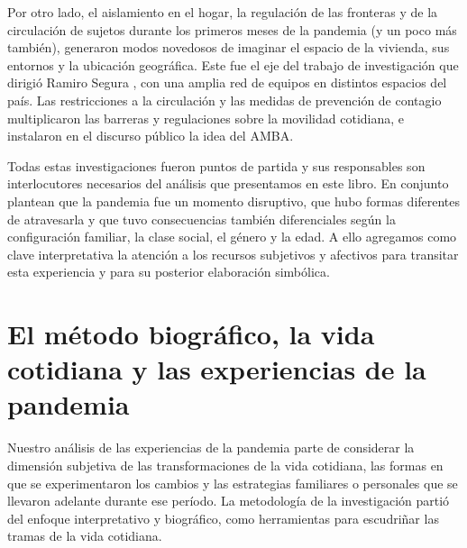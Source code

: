 \begin{refsection}
Por otro lado, el aislamiento en el hogar, la regulación de las fronteras y de la circulación de sujetos durante los primeros meses de la pandemia (y un poco más también), generaron modos novedosos de imaginar el espacio de la vivienda, sus entornos y la ubicación geográfica. Este fue el eje del trabajo de investigación que dirigió Ramiro Segura \protect\parencite*{4188-SEGURA2024}, con una amplia red de equipos en distintos espacios del país. Las restricciones a la circulación y las medidas de prevención de contagio multiplicaron las barreras y regulaciones sobre la movilidad cotidiana, e instalaron en el discurso público la idea del AMBA.

Todas estas investigaciones fueron puntos de partida y sus responsables son interlocutores necesarios del análisis que presentamos en este libro. En conjunto plantean que la pandemia fue un momento disruptivo, que hubo formas diferentes de atravesarla y que tuvo consecuencias también diferenciales según la configuración familiar, la clase social, el género y la edad. A ello agregamos como clave interpretativa la atención a los recursos subjetivos y afectivos para transitar esta experiencia y para su posterior elaboración simbólica.


\section[El método biográfico, la vida cotidiana y las experiencias de la pandemia]{El método biográfico, la vida cotidiana y las experiencias de la pandemia}
\label{cap-21.el-metodo-biografico-la-vida-cotidiana-y-las-experiencias-de-la-pandemia}
Nuestro análisis de las experiencias de la pandemia parte de considerar la dimensión subjetiva de las transformaciones de la vida cotidiana, las formas en que se experimentaron los cambios y las estrategias familiares o personales que se llevaron adelante durante ese período. La metodología de la investigación partió del enfoque interpretativo y biográfico, como herramientas para escudriñar las tramas de la vida cotidiana.


\end{refsection}
